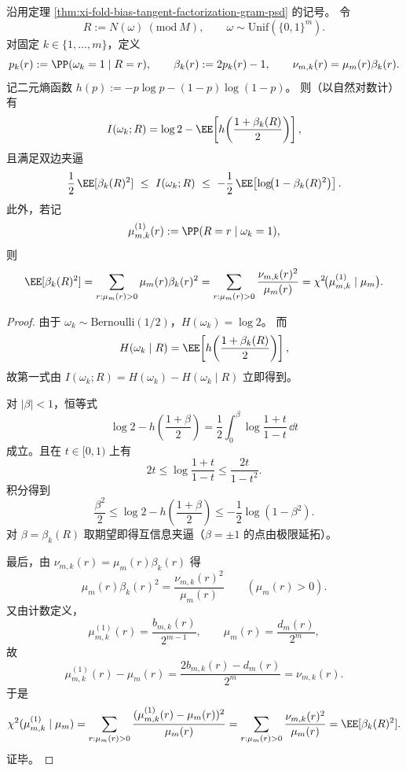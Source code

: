 \begin{theorem}\label{thm:xi-fold-singlebit-residue-mi-bounds}
沿用定理 \ref{thm:xi-fold-bias-tangent-factorization-gram-psd} 的记号。
令
\[
R:=N(\omega)\ (\mathrm{mod}\ M),\qquad \omega\sim\mathrm{Unif}(\{0,1\}^m).
\]
对固定 \(k\in\{1,\dots,m\}\)，定义
\[
p_k(r):=\PP(\omega_k=1\mid R=r),\qquad
\beta_k(r):=2p_k(r)-1,
\qquad
\nu_{m,k}(r)=\mu_m(r)\beta_k(r).
\]
记二元熵函数 \(h(p):=-p\log p-(1-p)\log(1-p)\)。
则（以自然对数计）有
\[
I(\omega_k;R)
=\log 2-\EE\!\left[h\!\left(\frac{1+\beta_k(R)}{2}\right)\right],
\]
且满足双边夹逼
\[
\frac12\,\EE[\beta_k(R)^2]
\ \le\
I(\omega_k;R)
\ \le\
-\frac12\,\EE\!\left[\log\!\bigl(1-\beta_k(R)^2\bigr)\right].
\]
此外，若记
\[
\mu_{m,k}^{(1)}(r):=\PP(R=r\mid \omega_k=1),
\]
则
\[
\EE[\beta_k(R)^2]
=\sum_{r:\mu_m(r)>0}\mu_m(r)\beta_k(r)^2
=\sum_{r:\mu_m(r)>0}\frac{\nu_{m,k}(r)^2}{\mu_m(r)}
=\chi^2\!\bigl(\mu_{m,k}^{(1)}\mid \mu_m\bigr).
\]
\end{theorem}
\begin{proof}
由于 \(\omega_k\sim\mathrm{Bernoulli}(1/2)\)，\(H(\omega_k)=\log 2\)。
而
\[
H(\omega_k\mid R)
=\EE\!\left[h\!\left(\frac{1+\beta_k(R)}{2}\right)\right],
\]
故第一式由 \(I(\omega_k;R)=H(\omega_k)-H(\omega_k\mid R)\) 立即得到。
\par
对 \(|\beta|<1\)，恒等式
\[
\log 2-h\!\left(\frac{1+\beta}{2}\right)
=\frac12\int_{0}^{\beta}\log\frac{1+t}{1-t}\,\dd t
\]
成立。且在 \(t\in[0,1)\) 上有
\[
2t\le \log\frac{1+t}{1-t}\le \frac{2t}{1-t^2}.
\]
积分得到
\[
\frac{\beta^2}{2}
\le
\log 2-h\!\left(\frac{1+\beta}{2}\right)
\le
-\frac12\log(1-\beta^2).
\]
对 \(\beta=\beta_k(R)\) 取期望即得互信息夹逼（\(\beta=\pm1\) 的点由极限延拓）。
\par
最后，由 \(\nu_{m,k}(r)=\mu_m(r)\beta_k(r)\) 得
\[
\mu_m(r)\beta_k(r)^2=\frac{\nu_{m,k}(r)^2}{\mu_m(r)}\qquad(\mu_m(r)>0).
\]
又由计数定义，
\[
\mu_{m,k}^{(1)}(r)=\frac{b_{m,k}(r)}{2^{m-1}},\qquad
\mu_m(r)=\frac{d_m(r)}{2^m},
\]
故
\[
\mu_{m,k}^{(1)}(r)-\mu_m(r)
=\frac{2b_{m,k}(r)-d_m(r)}{2^m}
=\nu_{m,k}(r).
\]
于是
\[
\chi^2(\mu_{m,k}^{(1)}\mid\mu_m)
=\sum_{r:\mu_m(r)>0}\frac{(\mu_{m,k}^{(1)}(r)-\mu_m(r))^2}{\mu_m(r)}
=\sum_{r:\mu_m(r)>0}\frac{\nu_{m,k}(r)^2}{\mu_m(r)}
=\EE[\beta_k(R)^2].
\]
证毕。
\end{proof}

